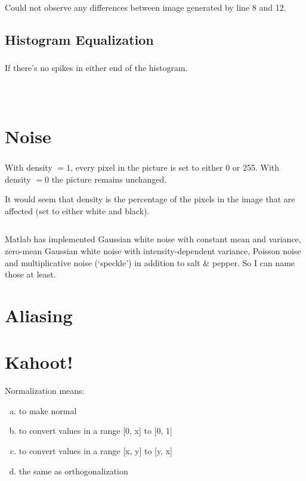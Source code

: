\inputminted[linenos=true]{octave}{../code/exercise04-1.m}

Could not observe any differences between image generated by line 8 and 12.

\subsection{Histogram Equalization}
\subsubsection{}
If there's no spikes in either end of the histogram.

\subsubsection{}
\inputminted[linenos=true]{octave}{../code/exercise04-2.m}

\subsubsection{}
\inputminted[linenos=true]{octave}{../code/exercise04-3.m}

\section{Noise}
\subsubsection{}
With density $= 1$, every pixel in the picture is set to either 0 or 255.
With density $= 0$ the picture remains unchanged.

It would seem that density is the percentage of the pixels in the image that are affected (set to either white and black).
\inputminted[linenos=true]{octave}{../code/exercise05.m}

Matlab has implemented Gaussian white noise with constant mean and variance, zero-mean Gaussian white noise with intensity-dependent variance, Poisson noise and multiplicative noise (`speckle') in addition to salt \& pepper.
So I can name those at least.

\section{Aliasing}


\section{Kahoot!}

Normalization means:
\begin{enumerate}[(a)]
    \item to make normal
    \item to convert values in a range [0, x] to [0, 1]
    \item to convert values in a range [x, y] to [y, x]
    \item the same as orthogonalization
\end{enumerate}


